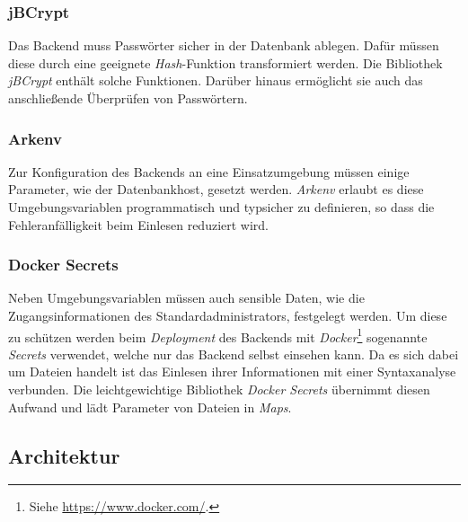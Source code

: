 \documentclass[a4paper, 11pt]{article}
\begin{document}
\subsubsection{jBCrypt}
\label{subsubsec:backend:bibs:jbcrypt}

Das Backend muss Passwörter sicher in der Datenbank ablegen.
Dafür müssen diese durch eine geeignete \textit{Hash}-Funktion transformiert werden.
Die Bibliothek \textit{jBCrypt} enthält solche Funktionen.
Darüber hinaus ermöglicht sie auch das anschließende Überprüfen von Passwörtern.

\subsubsection{Arkenv}
\label{subsubsec:backend:bibs:arkenv}

Zur Konfiguration des Backends an eine Einsatzumgebung müssen einige Parameter, wie der Datenbankhost, gesetzt werden.
\textit{Arkenv} erlaubt es diese Umgebungsvariablen programmatisch und typsicher zu definieren, so dass die Fehleranfälligkeit beim Einlesen reduziert wird.

\subsubsection{Docker Secrets}
\label{subsubsec:backend:bibs:dockersecrets}

Neben Umgebungsvariablen müssen auch sensible Daten, wie die Zugangsinformationen des Standardadministrators, festgelegt werden.
Um diese zu schützen werden beim \textit{Deployment} des Backends mit \textit{Docker}\footnote{Siehe \url{https://www.docker.com/}.} sogenannte \textit{Secrets} verwendet, welche nur das Backend selbst einsehen kann.
Da es sich dabei um Dateien handelt ist das Einlesen ihrer Informationen mit einer Syntaxanalyse verbunden.
Die leichtgewichtige Bibliothek \textit{Docker Secrets} übernimmt diesen Aufwand und lädt Parameter von Dateien in \textit{Maps}.

\subsection{Architektur}
\label{subsec:backend:architecture}
\end{document}
